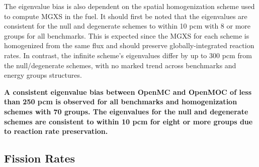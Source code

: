 
The eigenvalue bias is also dependent on the spatial homogenization scheme used to compute \ac{MGXS} in the fuel. It should first be noted that the eigenvalues are consistent for the null and degenerate schemes to within 10 \ac{pcm} with 8 or more groups for all benchmarks. This is expected since the \ac{MGXS} for each scheme is homogenized from the same flux and should preserve globally-integrated reaction rates. In contrast, the infinite scheme's eigenvalues differ by up to 300 \ac{pcm} from the null/degenerate schemes, with no marked trend across benchmarks and energy groups structures.



\begin{emphbox}
\textbf{A consistent eigenvalue bias between OpenMC and OpenMOC of less than 250 \ac{pcm} is observed for all benchmarks and homogenization schemes with 70 groups. The eigenvalues for the null and degenerate schemes are consistent to within 10 \ac{pcm} for eight or more groups due to reaction rate preservation.}
\end{emphbox}

\subsection{Fission Rates}
\label{subsec:chap8-fiss-rates}

